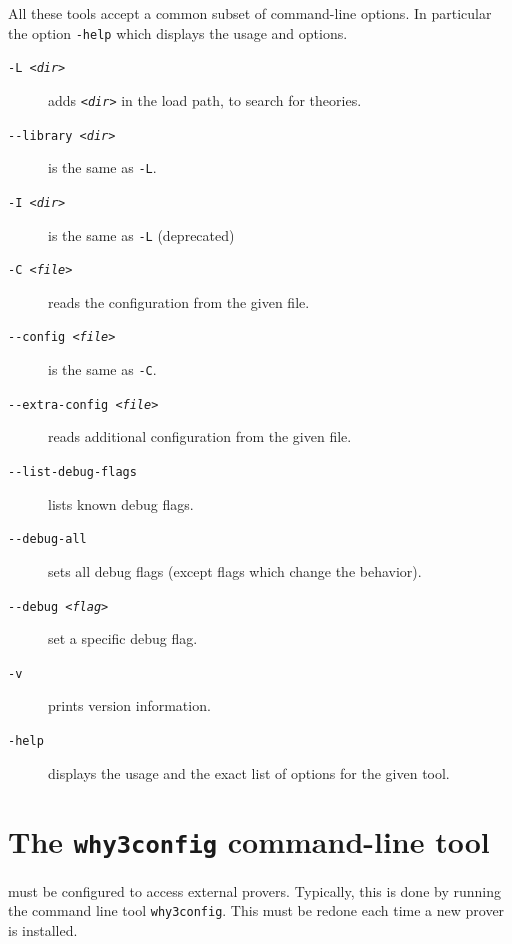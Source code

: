 All these tools accept a common subset of command-line options. In
particular the option \verb|-help| which displays the usage and options.
\begin{description}
\item[\texttt{-L \textsl{<dir>}}]
  adds \texttt{\textsl{<dir>}} in the load path, to search for theories.
\item[\texttt{-{}-library \textsl{<dir>}}]
  is the same as \verb|-L|.
\item[\texttt{-I \textsl{<dir>}}]
  is the same as \verb|-L| (deprecated)
\item[\texttt{-C \textsl{<file>}}]
  reads the configuration from the given file.
\item[\texttt{-{}-config \textsl{<file>}}]
  is the same as \verb|-C|.
\item[\texttt{-{}-extra-config \textsl{<file>}}]
  reads additional configuration from the given file.
\item[\texttt{-{}-list-debug-flags}]
  lists known debug flags.
\item[\texttt{-{}-debug-all}]
  sets all debug flags (except flags which change the behavior).
\item[\texttt{-{}-debug \textsl{<flag>}}]
  set a specific debug flag.
\item[\texttt{-v}]
  prints version information.
\item[\texttt{-help}]
  displays the usage and the exact list of options for the given tool.
\end{description}

\section{The \texttt{why3config} command-line tool}
\label{sec:why3config}

\why must be configured to access external provers. Typically, this is done
by running
the command line tool \texttt{why3config}.
This must be redone each time a new prover is installed.

